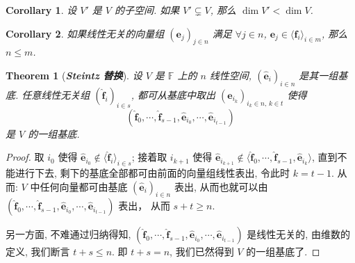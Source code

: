 \documentclass[openany]{ctexbook}
\newcommand*{\indexbf}[1]{\emph{\textbf{#1}}\index{#1}} %
\theoremstyle{plain}
\newtheorem{theorem}{Theorem}[section] %
\newtheorem{corollary}{Corollary} %
\theoremstyle{definition}
\newcommand*{\basis}[1]{\hat{\boldsymbol{#1}}} %
\newcommand*{\bv}{\boldsymbol} %
\begin{document}
\begin{corollary}
	设 $V'$ 是 $V$ 的子空间. 如果 $V' \subsetneq V$, 那么 $\dim V' < \dim V$.
\end{corollary}

\begin{corollary}
	如果线性无关的向量组 $(\bv e_j)_{j \in n} $ 满足 $\forall j \in n$, $\bv e_j \in  \langle\bv f_i\rangle_{i \in m}$, 那么 $n \leq m$.
\end{corollary}

\begin{theorem}[\indexbf{Steintz 替换}]\label{theorem:Steintz}
	设 $V$ 是 $\mathbb F$ 上的 $n$ 线性空间, $(\basis e_i)_{i \in n}$ 是其一组基底.
	任意线性无关组 $(\basis f_i)_{i \in s}$, 都可从基底中取出 $(\basis e_{i_k})_{i_k \in n,\, k \in t}$ 使得
	\begin{equation*}
		(\basis f_0, \cdots, \basis f_{s-1}, \basis e_{i_0}, \cdots, \basis e_{i_{t-1}})
	\end{equation*}
	是 $V$ 的一组基底.
\end{theorem}
\begin{proof}
	取 $i_0$ 使得 $\basis e_{i_0} \notin \langle\basis f_i\rangle_{i \in s}$; 
	接着取 $i_{k+1}$ 使得 $\basis e_{i_{k+1}} \notin \langle \basis f_0, \cdots, \basis f_{s-1}, \basis e_{i_k} \rangle $, 直到不能进行下去, 剩下的基底全部都可由前面的向量组线性表出, 令此时 $k = t - 1$.
	从而: $V$ 中任何向量都可由基底 $(\basis e_i)_{i \in n}$ 表出, 从而也就可以由
	$
		(\basis f_0, \cdots, \basis f_{s-1}, \basis e_{i_0}, \cdots, \basis e_{i_{t-1}})
	$ 表出， 从而 $s + t \geq n$. 

	另一方面, 不难通过归纳得知, 
	$
		(\basis f_0, \cdots, \basis f_{s-1}, \basis e_{i_0}, \cdots, \basis e_{i_{t-1}})
	$ 是线性无关的, 由维数的定义, 我们断言 $t + s \leq n$. 
	即 $t + s = n$, 我们已然得到 $V$ 的一组基底了.
\end{proof}
\end{document}
